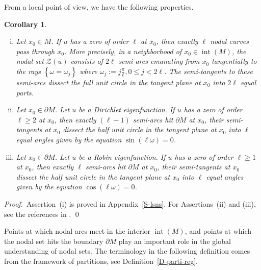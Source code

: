 \documentclass[12pt,a4paper]{amsart}
\theoremstyle{plain} %
\newtheorem{corollary}[theorem]{Corollary}
\theoremstyle{definition}
\numberwithin{equation}{section}
\numberwithin{figure}{section}
\numberwithin{table}{section}
\newcommand{\cZ}{\mathcal{Z}}
\DeclareMathOperator{\inte}{int}
\newcommand{\pf}{\emph{Proof.~}}
\newcommand{\set}[1]{\left\lbrace #1 \right\rbrace}
\begin{document}
From a local point of view, we have the following properties.

\begin{corollary}\label{cor:nodloc}~
\begin{enumerate}[(i)]
\item Let $x_0\in M$. If $u$ has a zero of order $\ell $ at $x_0$, then exactly $\ell$ nodal curves pass through $x_0$. More precisely, in a neighborhood of $x_0 \in \inte(M)$, the nodal set $\cZ(u)$ consists of $2\ell$ semi-arcs emanating from $x_0$ tangentially to the rays $\set{\omega = \omega_j}$ where $\omega_j := j \frac{\pi}{\ell}, 0\le j < 2\ell$. The semi-tangents to these semi-arcs dissect the full unit circle in the tangent plane at $x_0$ into $2\ell $
    equal parts.
\item Let $x_0\in \partial M$. Let $u$ be a Dirichlet eigenfunction. If $u$ has a zero of order $\ell \ge 2$ at $x_0$, then exactly $(\ell-1)$ semi-arcs hit $\partial M$ at $x_0$, their  semi-tangents at $x_0$ dissect the half unit circle in the tangent plane at $x_0$ into $\ell$ equal angles given by the equation $\sin(\ell \omega) =0$.
\item Let $x_0\in \partial M$. Let $u$ be a Robin eigenfunction. If $u$ has a zero of order $\ell \ge 1$ at $x_0$, then exactly $\ell$ semi-arcs hit $\partial M$ at $x_0$, their  semi-tangents  at $x_0$ dissect the half unit circle in the tangent plane at $x_0$ into $\ell$ equal angles given by the equation $\cos(\ell \omega) =0$.
\end{enumerate}
\end{corollary}%

\pf Assertion~(i) is proved in Appendix~\ref{S-lsns}.  For Assertions~(ii) and (iii), see the references in \cite[Appendix]{GiHe2019}. \hfill\qed \medskip

Points at which nodal arcs meet in the interior $\inte(M)$, and points at which the nodal set hits the boundary $\partial M$ play an important role in the global understanding of nodal sets. The terminology in the following definition comes from the framework of partitions, see Definition~\ref{D-parti-reg}.
\end{document}

